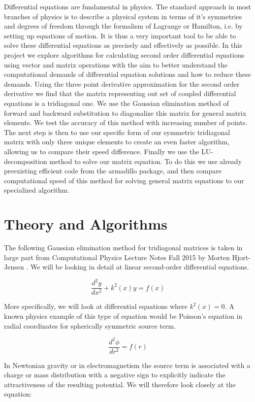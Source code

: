 \documentclass[a4paper,11pt]{article}
\begin{document}
{Differential equations are fundamental in physics. The standard approach in most branches of physics is to describe a physical system in terms of it's symmetries and degrees of freedom through the formalism of Lagrange or Hamilton, i.e. by setting up equations of motion. It is thus a very important tool to be able to solve these differential equations as precisely and effectively as possible. In this project we explore algorithms for calculating second order differential equations using vector and matrix operations with the aim to better understand the computational demands of differential equation solutions and how to reduce these demands. Using the three point derivative approximation for the second order derivative we find that the matrix representing out set of coupled differential equations is a tridiagonal one. We use the Gaussian elimination method of forward and backward substitution to diagonalize this matrix for general matrix elements. We test the accuracy of this method with increasing number of points. The next step is then to use our specific form of our symmetric tridiagonal matrix with only three unique elements to create an even faster algorithm, allowing us to compare their speed difference. Finally we use the LU-decomposition method to solve our matrix equation. To do this we use already preexisting efficient code from the armadillo package, and then compare computational speed of this method for solving general matrix equations to our specialized algorithm.
		
		
		
\section*{Theory and Algorithms}
		
The following Gaussian elimination method for tridiagonal matrices is taken in large part from Computational Physics Lecture Notes Fall 2015 by Morten Hjort-Jensen \cite{M.Hjort-Jensen_CompFys}. We will be looking in detail at linear second-order differential equations.
		
$$\frac{d^2y}{dx^2} + k^2(x) y = f(x)$$
		
More specifically, we will look at differential equations where $k^2(x) = 0$. A known physics example of this type of equation would be Poisson's equation in radial coordinates for spherically symmetric source term.
		
$$\frac{d^2 \phi}{d r^2} = f(r)$$
		
In Newtonian gravity or in electromagnetism the source term is associated with a charge or mass distribution with a negative sign to explicitly indicate the attractiveness of the resulting potential. We will therefore look closely at the equation:
		
}
\end{document}
